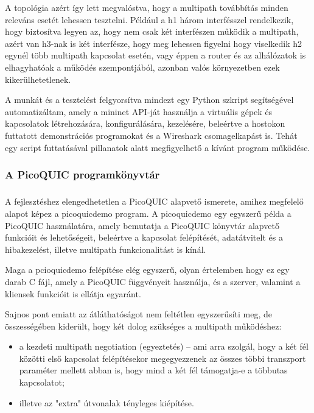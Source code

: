 \documentclass[a4paper,oneside]{article}
\begin{document}
A topológia azért így lett megvalóstva, hogy a multipath továbbítás minden releváns esetét lehessen tesztelni. 
Például a h1 három interfésszel rendelkezik, hogy biztosítva legyen az, hogy nem csak két interfészen működik a multipath, azért van h3-nak is két interfésze, 
hogy meg lehessen figyelni hogy viselkedik h2 egynél több multipath kapcsolat esetén, 
vagy éppen a router és az alhálózatok is elhagyhatóak a működés szempontjából, azonban valós környezetben ezek kikerülhetetlenek. 

A munkát és a tesztelést felgyorsítva mindezt egy Python szkript segítségével automatizáltam, 
amely a mininet API-ját használja a virtuális gépek és kapcsolatok létrehozására, konfigurálására, kezelésére, beleértve
a hostokon futtatott demonstrációs programokat és a Wireshark csomagelkapást is.
Tehát egy script futtatásával pillanatok alatt megfigyelhető a kívánt program működése.

\subsubsection{A PicoQUIC programkönyvtár}

\subparagraph{}
A fejlesztéshez elengedhetetlen a PicoQUIC alapvető ismerete, amihez megfelelő alapot képez a picoquicdemo program.
A picoquicdemo egy egyszerű példa a PicoQUIC használatára, amely bemutatja a
PicoQUIC könyvtár alapvető funkcióit és lehetőségeit, beleértve a kapcsolat
felépítését, adatátvitelt és a hibakezelést, illetve multipath funkcionalitást is kínál. 

Maga a pcioquicdemo felépítése elég egyszerű, olyan értelemben hogy ez egy darab C fájl, amely a PicoQUIC függvényeit használja, 
és a szerver, valamint a kliensek funkcióit is ellátja egyaránt. 

Sajnos pont emiatt az átláthatóságot nem feltétlen egyszerűsíti meg, de összességében kiderült, hogy két dolog szükséges a multipath működéshez:

\begin{itemize}

  \item a kezdeti multipath negotiation (egyeztetés) – ami arra szolgál, hogy a két fél közötti első
  kapcsolat felépítésekor megegyezzenek az összes többi transzport paraméter mellett abban is, 
  hogy mind a két fél támogatja-e a többutas kapcsolatot;

  \item illetve az "extra" útvonalak tényleges kiépítése.

\end{itemize}
\end{document}
